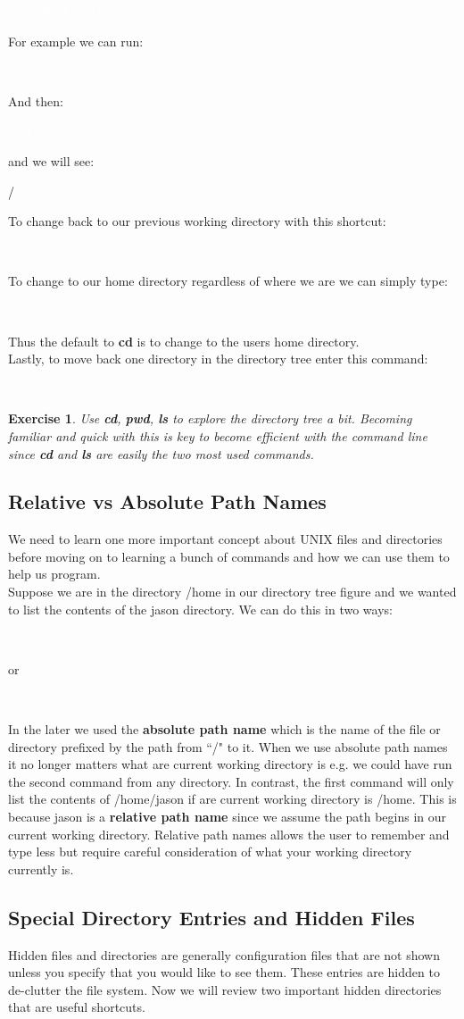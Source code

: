 \documentclass[oneside]{book}
\newcommand{\commandline}[1]{\begin{center} \colorbox{Dark}{\textcolor{white}{#1}} \end{center}}
\newcommand{\exampleout}[1]{\begin{center} \colorbox{Light}{\textcolor{black}{#1}} \end{center}}
\newtheorem{ex}{Exercise}[chapter]
\begin{document}
\commandline{cd dirToChangeTo}
For example we can run:
\commandline{cd /}
And then:
\commandline{pwd}
and we will see:
\exampleout{/}
To change back to our previous working directory with this shortcut:
\commandline{cd -}
To change to our home directory regardless of where we are we can simply type:
\commandline{cd}
Thus the default to \textbf{cd} is to change to the users home directory. \\
Lastly, to move back one directory in the directory tree enter this command:
\commandline{cd ../}

\begin{ex}
	Use \textbf{cd}, \textbf{pwd}, \textbf{ls} to explore the directory tree a bit. Becoming familiar and quick with this is key to become efficient with the command line since \textbf{cd} and \textbf{ls} are easily the two most used commands.
\end{ex}

\subsection{Relative vs Absolute Path Names}
We need to learn one more important concept about UNIX files and directories before moving on to learning a bunch of commands and how we can use them to help us program. \\
Suppose we are in the directory /home in our directory tree figure and we wanted to list the contents of the jason directory. We can do this in two ways:
\commandline{ls jason}
or
\commandline{ls /home/jason}
In the later we used the \textbf{absolute path name} which is the name of the file or directory prefixed by the path from ``/" to it. When we use absolute path names it no longer matters what are current working directory is e.g. we could have run the second command from any directory. In contrast, the first command will only list the contents of /home/jason if are current working directory is /home. This is because jason is a \textbf{relative path name} since we assume the path begins in our current working directory. Relative path names allows the user to remember and type less but require careful consideration of what your working directory currently is. 

\subsection{Special Directory Entries and Hidden Files}

Hidden files and directories are generally configuration files that are not shown unless you specify that you would like to see them. These entries are hidden to de-clutter the file system. Now we will review two important hidden directories that are useful shortcuts.
\end{document}
